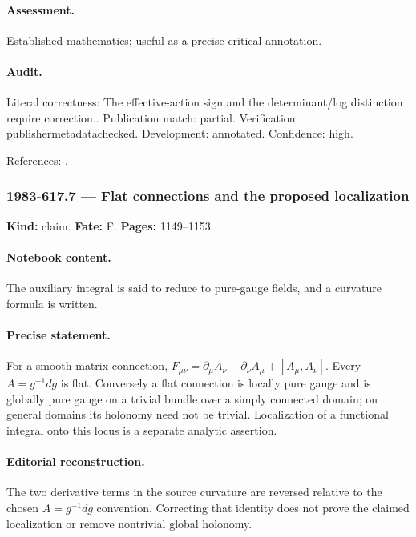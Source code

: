 \paragraph{Assessment.} Established mathematics; useful as a precise critical annotation.

\paragraph{Audit.} Literal correctness: The effective-action sign and the determinant/log distinction require correction.. Publication match: partial. Verification: publishermetadatachecked. Development: annotated. Confidence: high.

\noindent References: \citep{polyakovwiegmann1983goldstone,polyakovwiegmann1984multivalued}.\par

\subsubsection{1983-617.7 --- Flat connections and the proposed localization}

\label{item:1983-617.7}

\noindent\textbf{Kind:} claim. \textbf{Fate:} F. \textbf{Pages:} 1149--1153.\par

\paragraph{Notebook content.} The auxiliary integral is said to reduce to pure-gauge fields, and a curvature formula is written.

\paragraph{Precise statement.} For a smooth matrix connection, $F_{\mu\nu}=\partial_\mu A_\nu-\partial_\nu A_\mu+[A_\mu,A_\nu]$. Every $A=g^{-1}dg$ is flat. Conversely a flat connection is locally pure gauge and is globally pure gauge on a trivial bundle over a simply connected domain; on general domains its holonomy need not be trivial. Localization of a functional integral onto this locus is a separate analytic assertion.

\paragraph{Editorial reconstruction.} The two derivative terms in the source curvature are reversed relative to the chosen $A=g^{-1}dg$ convention. Correcting that identity does not prove the claimed localization or remove nontrivial global holonomy.

